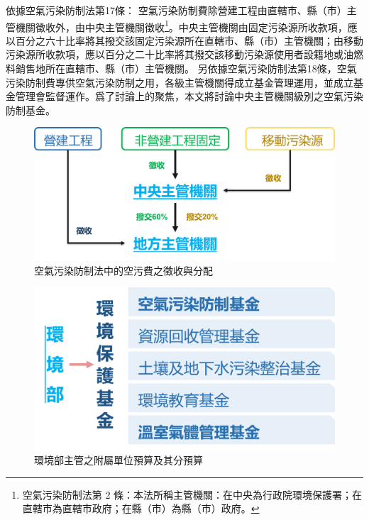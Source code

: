 \documentclass[12pt,a4paper]{article}
\begin{document}



依據空氣污染防制法第17條：
空氣污染防制費除營建工程由直轄市、縣（市）主管機關徵收外，由中央主管機關徵收\footnote{空氣污染防制法第 2 條：本法所稱主管機關：在中央為行政院環境保護署；在直轄市為直轄市政府；在縣（市）為縣（巿）政府。}。中央主管機關由固定污染源所收款項，應以百分之六十比率將其撥交該固定污染源所在直轄市、縣（市）主管機關；由移動污染源所收款項，應以百分之二十比率將其撥交該移動污染源使用者設籍地或油燃料銷售地所在直轄市、縣（市）主管機關。
另依據空氣污染防制法第18條，空氣污染防制費專供空氣污染防制之用，各級主管機關得成立基金管理運用，並成立基金管理會監督運作。爲了討論上的聚焦，本文將討論中央主管機關級別之空氣污染防制基金。


\begin{figure}
  \centering
  \includegraphics[width=0.8\linewidth]{img/income.png}
  \caption[空氣污染防制法中的空污費之徵收與分配]{空氣污染防制法中的空污費之徵收與分配 \footnotemark }
  \label{fig:your_label}
\end{figure}

\begin{figure}
  \centering
  \includegraphics[width=0.6\linewidth]{img/structure2.png}
  \caption[環境部主管之附屬單位預算及其分預算]{環境部主管之附屬單位預算及其分預算 \footnotemark }
  \label{fig:structure}
\end{figure}
\end{document}
